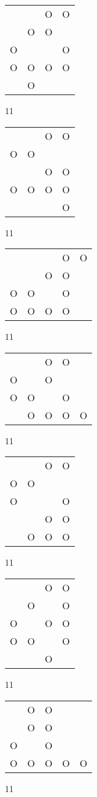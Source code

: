 \begin{tabular}{|m{0.2cm}m{0.2cm}m{0.2cm}m{0.2cm}|}\hline
 & &O&O\\
 &O&O& \\
O& & &O\\
O&O&O&O\\
 &O& & \\
\hline\end{tabular}11
\begin{tabular}{|m{0.2cm}m{0.2cm}m{0.2cm}m{0.2cm}|}\hline
 & &O&O\\
O&O& & \\
 & &O&O\\
O&O&O&O\\
 & & &O\\
\hline\end{tabular}11
\begin{tabular}{|m{0.2cm}m{0.2cm}m{0.2cm}m{0.2cm}m{0.2cm}|}\hline
 & & &O&O\\
 & &O&O& \\
O&O& &O& \\
O&O&O&O& \\
\hline\end{tabular}11
\begin{tabular}{|m{0.2cm}m{0.2cm}m{0.2cm}m{0.2cm}m{0.2cm}|}\hline
 & &O&O& \\
O& &O& & \\
O&O& &O& \\
 &O&O&O&O\\
\hline\end{tabular}11
\begin{tabular}{|m{0.2cm}m{0.2cm}m{0.2cm}m{0.2cm}|}\hline
 & &O&O\\
O&O& & \\
O& & &O\\
 & &O&O\\
 &O&O&O\\
\hline\end{tabular}11
\begin{tabular}{|m{0.2cm}m{0.2cm}m{0.2cm}m{0.2cm}|}\hline
 & &O&O\\
 &O& &O\\
O& &O&O\\
O&O& &O\\
 & &O& \\
\hline\end{tabular}11
\begin{tabular}{|m{0.2cm}m{0.2cm}m{0.2cm}m{0.2cm}m{0.2cm}|}\hline
 &O&O& & \\
 &O&O& & \\
O& &O& & \\
O&O&O&O&O\\
\hline\end{tabular}11
